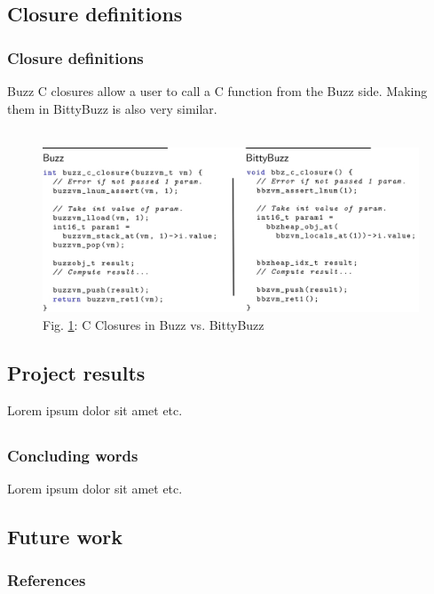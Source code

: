 \documentclass{beamer}
\begin{document}
	\begin{frame}
		\subsection{Closure definitions}
		\frametitle{Closure definitions}
		Buzz C closures allow a user to call a C function from the Buzz side. Making them in BittyBuzz is also very similar.\\
		~\\
		\begin{figure}
			\includegraphics[width=1\textwidth]{ClosureDefinitions}
			\caption{\label{figure:C Closures}Fig. \ref{figure:C Closures}: C Closures in Buzz vs. BittyBuzz}
		\end{figure}
	\end{frame}
	\begin{frame}
		\section{Project results}
		Lorem ipsum dolor sit amet etc.
	\end{frame}
	\begin{frame}
		\section{}
		\frametitle{Concluding words}
		Lorem ipsum dolor sit amet etc.
	\end{frame}
	\begin{frame}
		\section{Future work}
	\end{frame}
	\begin{frame}
		\frametitle[allowframebreaks]{References}
		
		
	\end{frame}
\end{document}
